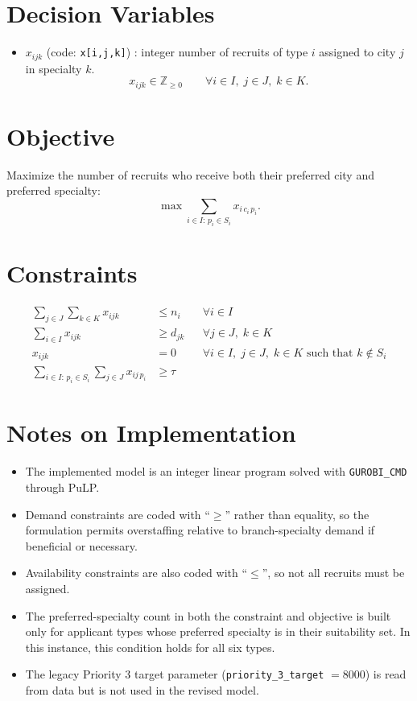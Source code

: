 \section*{Decision Variables}

\begin{itemize}
    \item $x_{ijk}$ (code: \texttt{x[i,j,k]}) : integer number of recruits of type $i$ assigned to city $j$ in specialty $k$.
    \[
    x_{ijk}\in \mathbb{Z}_{\ge 0}\qquad \forall i\in I,\; j\in J,\; k\in K.
    \]
\end{itemize}

\section*{Objective}

Maximize the number of recruits who receive both their preferred city and preferred specialty:
\[
\max \sum_{i\in I:\, p_i\in S_i} x_{i\,c_i\,p_i}.
\]

\section*{Constraints}

\begin{align}
\sum_{j\in J}\sum_{k\in K} x_{ijk} &\le n_i
&& \forall i\in I
\label{cons:supply}
\\
\sum_{i\in I} x_{ijk} &\ge d_{jk}
&& \forall j\in J,\; k\in K
\label{cons:demand}
\\
x_{ijk} &= 0
&& \forall i\in I,\; j\in J,\; k\in K \text{ such that } k\notin S_i
\label{cons:suitability}
\\
\sum_{i\in I:\, p_i\in S_i}\sum_{j\in J} x_{ij\,p_i} &\ge \tau
\label{cons:preferred-specialty}
\end{align}

\section*{Notes on Implementation}

\begin{itemize}
    \item The implemented model is an integer linear program solved with \texttt{GUROBI\_CMD} through PuLP.
    \item Demand constraints are coded with ``$\ge$'' rather than equality, so the formulation permits overstaffing relative to branch-specialty demand if beneficial or necessary.
    \item Availability constraints are also coded with ``$\le$'', so not all recruits must be assigned.
    \item The preferred-specialty count in both the constraint and objective is built only for applicant types whose preferred specialty is in their suitability set. In this instance, this condition holds for all six types.
    \item The legacy Priority 3 target parameter (\texttt{priority\_3\_target} $=8000$) is read from data but is not used in the revised model.
\end{itemize}
